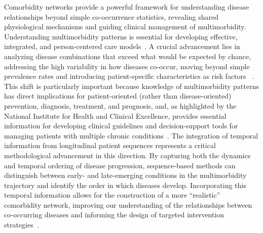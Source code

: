 Comorbidity networks provide a powerful framework for understanding disease relationships beyond simple co-occurrence statistics, revealing shared physiological mechanisms and guiding clinical management of multimorbidity. Understanding multimorbidity patterns is essential for developing effective, integrated, and person-centered care models~\cite{Chiadi2023}. A crucial advancement lies in analyzing disease combinations that exceed what would be expected by chance, addressing the high variability in how diseases co-occur, moving beyond simple prevalence rates and introducing patient-specific characteristics as risk factors ~\cite{EPF2012ChronicDiseaseResponse}. This shift is particularly important because knowledge of multimorbidity patterns has direct implications for patient-oriented (rather than disease-oriented) prevention, diagnosis, treatment, and prognosis, and, as highlighted by the National Institute for Health and Clinical Excellence, provides essential information for developing clinical guidelines and decision-support tools for managing patients with multiple chronic conditions~\cite{NICE2016NG56}. The integration of temporal information from longitudinal patient sequences represents a critical methodological advancement in this direction. By capturing both the dynamics and temporal ordering of disease progression, sequence-based methods can distinguish between early- and late-emerging conditions in the multimorbidity trajectory and identify the order in which diseases develop. Incorporating this temporal information allows for the construction of a more “realistic” comorbidity network, improving our understanding of the relationships between co-occurring diseases and informing the design of targeted intervention strategies~\cite{siggaard2020disease}. 


